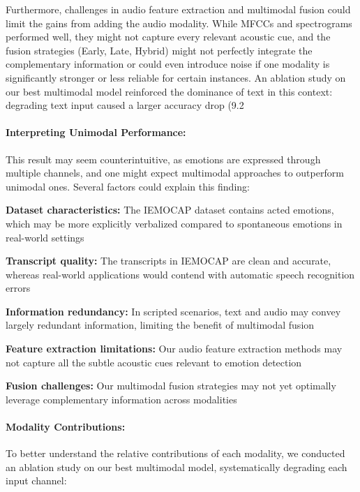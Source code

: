 \documentclass[12pt]{article}
\begin{document}
Furthermore, challenges in audio feature extraction and multimodal fusion could limit the gains from adding the audio modality. While MFCCs and spectrograms performed well, they might not capture every relevant acoustic cue, and the fusion strategies (Early, Late, Hybrid) might not perfectly integrate the complementary information or could even introduce noise if one modality is significantly stronger or less reliable for certain instances. An ablation study on our best multimodal model reinforced the dominance of text in this context: degrading text input caused a larger accuracy drop (9.2%

\paragraph{Interpreting Unimodal Performance:}
This result may seem counterintuitive, as emotions are expressed through multiple channels, and one might expect multimodal approaches to outperform unimodal ones. Several factors could explain this finding:

    \textbf{Dataset characteristics:} The IEMOCAP dataset contains acted emotions, which may be more explicitly verbalized compared to spontaneous emotions in real-world settings
    
    \textbf{Transcript quality:} The transcripts in IEMOCAP are clean and accurate, whereas real-world applications would contend with automatic speech recognition errors
    
    \textbf{Information redundancy:} In scripted scenarios, text and audio may convey largely redundant information, limiting the benefit of multimodal fusion
    
    \textbf{Feature extraction limitations:} Our audio feature extraction methods may not capture all the subtle acoustic cues relevant to emotion detection
    
    \textbf{Fusion challenges:} Our multimodal fusion strategies may not yet optimally leverage complementary information across modalities

\paragraph{Modality Contributions:}
To better understand the relative contributions of each modality, we conducted an ablation study on our best multimodal model, systematically degrading each input channel:
\end{document}
